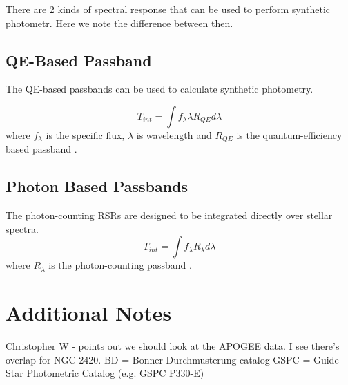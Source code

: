 \documentclass{aastex6}
\begin{document}
There are 2 kinds of spectral response that can be used to perform synthetic photometr.
Here we note the difference between then.

\subsection{QE-Based Passband}
The QE-based passbands can be used to calculate synthetic photometry.

\begin{equation}
T_{int} = \int{f_\lambda \lambda R_{QE} d\lambda} 
\end{equation}
where $f_\lambda$ is the specific flux, $\lambda$ is wavelength and $R_{QE}$ is the quantum-efficiency based passband \citep[e.g][]{bessel2000fundamentalPhot}.

\subsection{Photon Based Passbands}
The photon-counting RSRs are designed to be integrated directly over stellar spectra.
\begin{equation}
T_{int} = \int{f_\lambda R_{\lambda} d\lambda} 
\end{equation}
where $R_{\lambda}$ is the photon-counting passband \citep[e.g][]{cohen2003}.

\section{Additional Notes}

Christopher W - points out we should look at the APOGEE data. I see there's overlap for NGC 2420.
BD = Bonner Durchmusterung catalog
GSPC = Guide Star Photometric Catalog (e.g. GSPC P330-E)

\end{document}
